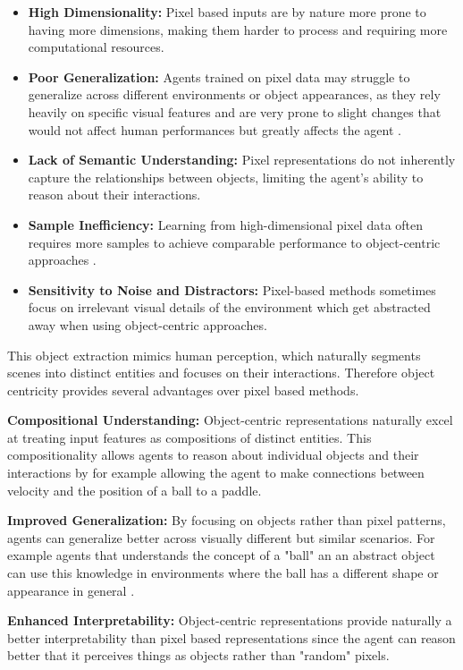 \documentclass[
	english,
	ruledheaders=section,
	class=report,
	thesis={type=master},
	accentcolor=9c,
	custommargins=true,
	marginpar=false,
	parskip=half-,
	fontsize=11pt,
]{tudapub}
\begin{document}
\begin{itemize}
	\item \textbf{High Dimensionality:} Pixel based inputs are by nature more prone to having more dimensions, making them harder to process and requiring more computational resources.
	\item \textbf{Poor Generalization:} Agents trained on pixel data may struggle to generalize across different environments or object appearances, as they rely heavily on specific visual features and are very prone to slight changes that would not affect human performances but greatly affects the agent \cite{zhang2020learning,stone2021distracting}.
	\item \textbf{Lack of Semantic Understanding:} Pixel representations do not inherently capture the relationships between objects, limiting the agent's ability to reason about their interactions.
	\item \textbf{Sample Inefficiency:} Learning from high-dimensional pixel data often requires more samples to achieve comparable performance to object-centric approaches \cite{watters2019cobra}.
	\item \textbf{Sensitivity to Noise and Distractors:} Pixel-based methods sometimes focus on irrelevant visual details of the environment which get abstracted away when using object-centric approaches.
\end{itemize}

This object extraction mimics human perception, which naturally segments scenes
into distinct entities and focuses on their interactions. Therefore object centricity provides several advantages over pixel based
methods.

\textbf{Compositional Understanding:} Object-centric representations naturally excel at treating input features as compositions of distinct entities.
This compositionality allows agents to reason about individual objects and their interactions by for example allowing the agent
to make connections between velocity and the position of a ball to a paddle.

\textbf{Improved Generalization:} By focusing on objects rather than pixel patterns, agents can generalize better across visually different but similar scenarios. For example agents that
understands the concept of a "ball" an an abstract object can use this knowledge in environments where the ball has a different shape or appearance in general \cite{zambaldi2018deep}.

\textbf{Enhanced Interpretability:} Object-centric representations provide naturally a better interpretability than pixel based representations since the agent can reason better that it perceives things as objects rather than "random" pixels.
\end{document}
